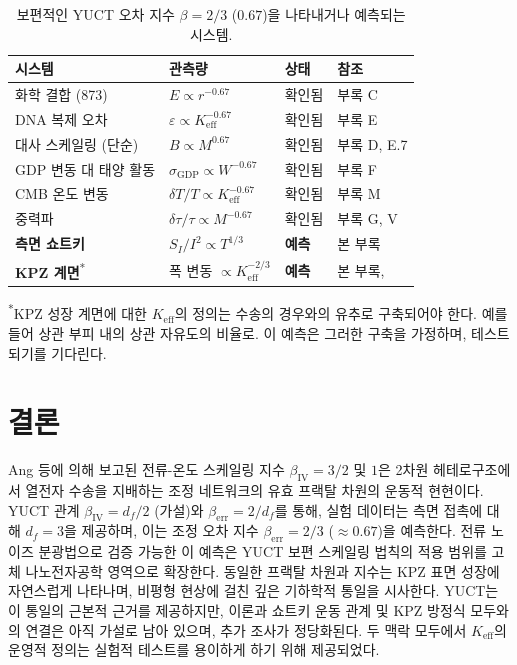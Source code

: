\documentclass[12pt,a4paper]{article}
\newcommand{\Keff}{K_{\mathrm{eff}}}
\theoremstyle{remark}
\begin{document}
	\begin{table}[H]
		\centering
		\caption{보편적인 YUCT 오차 지수 $\beta = 2/3$ ($0.67$)을 나타내거나 예측되는 시스템.}
		\label{tab:universal-beta}
		\begin{tabular}{@{}llll@{}}
			\toprule
			\textbf{시스템} & \textbf{관측량} & \textbf{상태} & \textbf{참조}\\
			\midrule
			화학 결합 (873)      & $E \propto r^{-0.67}$               & 확인됨  & 부록 C \\
			DNA 복제 오차    & $\varepsilon \propto \Keff^{-0.67}$ & 확인됨  & 부록 E \\
			대사 스케일링 (단순)& $B \propto M^{0.67}$               & 확인됨  & 부록 D, E.7 \\
			GDP 변동 대 태양 활동   & $\sigma_{\mathrm{GDP}} \propto W^{-0.67}$ & 확인됨 & 부록 F \\
			CMB 온도 변동    & $\delta T/T \propto \Keff^{-0.67}$ & 확인됨  & 부록 M \\
			중력파       & $\delta\tau/\tau \propto M^{-0.67}$& 확인됨  & 부록 G, V \\
			\textbf{측면 쇼트키} & $S_I/I^2 \propto T^{1/3}$          & \textbf{예측} & 본 부록 \\
			\textbf{KPZ 계면}\textsuperscript{*} & 폭 변동 $\propto \Keff^{-2/3}$& \textbf{예측} & 본 부록, \cite{KPZ}\\
			\bottomrule
		\end{tabular}
		
		\vspace{0.3cm}
		{\footnotesize \textsuperscript{*}KPZ 성장 계면에 대한 $K_{\mathrm{eff}}$의 정의는 수송의 경우와의 유추로 구축되어야 한다. 예를 들어 상관 부피 내의 상관 자유도의 비율로. 이 예측은 그러한 구축을 가정하며, 테스트되기를 기다린다.}
	\end{table}
	
	\section{결론}
	Ang 등에 의해 보고된 전류-온도 스케일링 지수 $\beta_{\mathrm{IV}} = 3/2$ 및 $1$은
	2차원 헤테로구조에서 열전자 수송을 지배하는 조정 네트워크의 유효 프랙탈 차원의
	운동적 현현이다. YUCT 관계 $\beta_{\mathrm{IV}} = d_f/2$ (가설)와
	$\beta_{\mathrm{err}} = 2/d_f$를 통해, 실험 데이터는 측면 접촉에 대해
	$d_f = 3$을 제공하며, 이는 조정 오차 지수 $\beta_{\mathrm{err}} = 2/3$ ($\approx 0.67$)을
	예측한다. 전류 노이즈 분광법으로 검증 가능한 이 예측은 YUCT 보편 스케일링 법칙의
	적용 범위를 고체 나노전자공학 영역으로 확장한다. 동일한 프랙탈 차원과 지수는
	KPZ 표면 성장에 자연스럽게 나타나며, 비평형 현상에 걸친 깊은 기하학적 통일을
	시사한다. YUCT는 이 통일의 근본적 근거를 제공하지만, 이론과 쇼트키 운동 관계
	및 KPZ 방정식 모두와의 연결은 아직 가설로 남아 있으며, 추가 조사가 정당화된다.
	두 맥락 모두에서 $\Keff$의 운영적 정의는 실험적 테스트를 용이하게 하기 위해
	제공되었다.
	
\end{document}
